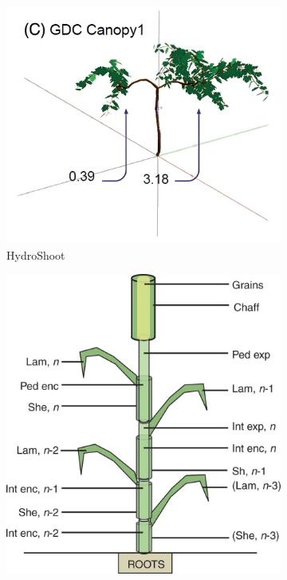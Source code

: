 \begin{figure}
    \centering
    \begin{subfigure}[b]{0.485\linewidth}
        \centering
        \includegraphics[width=\linewidth,height=\linewidth,keepaspectratio]{img/hydroshoot_can1_upscaled.jpg}
        \caption{HydroShoot}
        \label{fig:hydroshoot-archi}
    \end{subfigure}
    \hfill
    \begin{subfigure}[b]{0.485\linewidth}
        \centering
        \includegraphics[width=\linewidth,height=0.85\linewidth,keepaspectratio]{img/cnwheat_architecture.jpeg}

\end{subfigure}
\end{figure}

